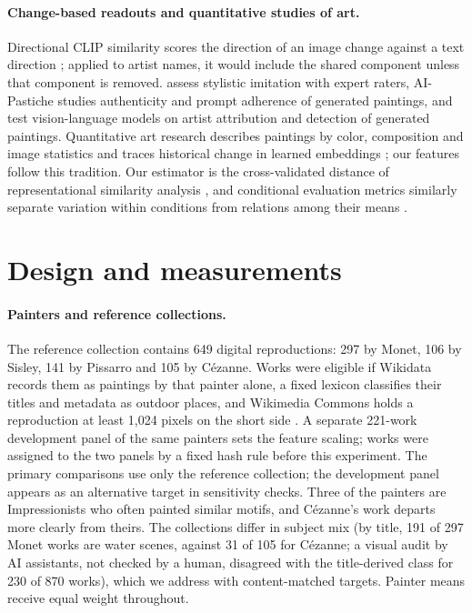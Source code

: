 \documentclass[10pt]{article}
\begin{document}
\paragraph{Change-based readouts and quantitative studies of art.}
Directional CLIP similarity scores the direction of an image change against a text direction
\citep{gal2022stylegannada,brooks2023instructpix2pix}; applied to artist names, it would include
the shared component unless that component is removed. \citet{deliege2025} assess stylistic
imitation with expert raters, AI-Pastiche \citep{asperti2025pastiche} studies authenticity and
prompt adherence of generated paintings, and \citet{fu2025aiwikiart} test vision-language models
on artist attribution and detection of generated paintings. Quantitative art research describes
paintings by color, composition and image statistics \citep{kim2014,sigaki2018,lee2020} and
traces historical change in learned embeddings \citep{kim2026}; our features follow this
tradition. Our estimator is the cross-validated distance of representational similarity analysis
\citep{diedrichsen2017representational}, and conditional evaluation metrics similarly separate
variation within conditions from relations among their means \citep{naeem2020,benny2021conditional}.

\section{Design and measurements}\label{sec:design}

\paragraph{Painters and reference collections.}
The reference collection contains 649 digital reproductions: 297 by Monet, 106 by Sisley, 141 by
Pissarro and 105 by C\'ezanne. Works were eligible if Wikidata records them as paintings by that
painter alone, a fixed lexicon classifies their titles and metadata as outdoor places, and
Wikimedia Commons holds a reproduction at least 1,024 pixels on the short side
\citep{wikimediacommons,vrandecic2014wikidata}. A separate 221-work development panel of the same
painters sets the feature scaling; works were assigned to the two panels by a fixed hash rule
before this experiment. The primary comparisons use only the reference collection; the
development panel appears as an alternative target in sensitivity checks. Three of the painters
are Impressionists who often painted similar motifs, and C\'ezanne's work departs more clearly
from theirs. The collections differ in subject mix (by title, 191 of 297 Monet works are water
scenes, against 31 of 105 for C\'ezanne; a visual audit by AI assistants, not checked by a human,
disagreed with the title-derived class for 230 of 870 works), which we address with
content-matched targets. Painter means receive equal weight throughout.
\end{document}
